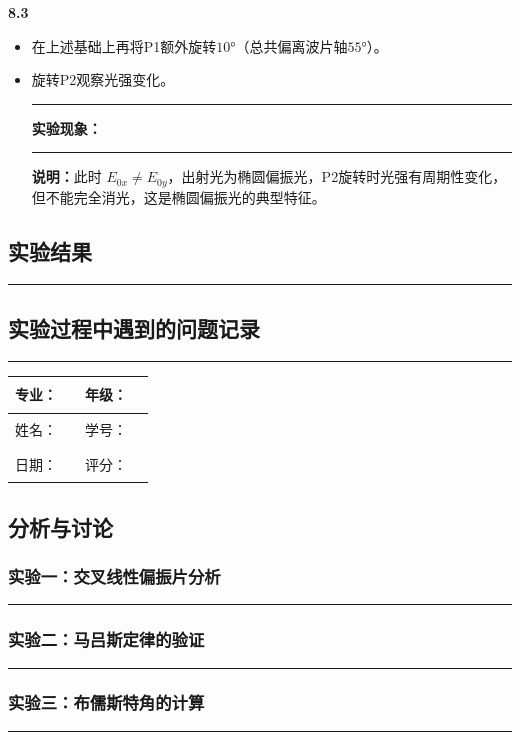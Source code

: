 \documentclass[dvipsnames, svgnames,a4paper,11pt]{article}
\newcommand{\recordblank}[1]{%
  \par\noindent\rule{0.95\linewidth}{0pt}\rule{0pt}{#1}\par}
\begin{document}
\textbf{8.3}
\begin{itemize}
    \item 在上述基础上再将P1额外旋转$10°$（总共偏离波片轴$55°$）。
    \item 旋转P2观察光强变化。
    \recordblank{6cm}
    \par\noindent\textbf{实验现象：}\par
\recordblank{4cm}
    
    \textbf{说明：}此时 $E_{0x} \neq E_{0y}$，出射光为椭圆偏振光，P2旋转时光强有周期性变化，但不能完全消光，这是椭圆偏振光的典型特征。
\end{itemize}

\subsection{实验结果}

\recordblank{5.5cm}
\subsection{实验过程中遇到的问题记录}
\recordblank{5cm}
\clearpage
\begin{table}
	\renewcommand\arraystretch{1.7}
	\begin{tabularx}{\textwidth}{|X|X|X|X|}
	\hline
	专业：& \rule{2.5cm}{0.4pt} & 年级：& \rule{2.5cm}{0.4pt}\\
	\hline
	姓名：& \rule{2.5cm}{0.4pt} & 学号：& \rule{3cm}{0.4pt}\\
	\hline
	日期：& \rule{3cm}{0.4pt} & 评分：& \rule{3cm}{0.4pt}\\
	\hline
	\end{tabularx}
\end{table}

\subsection{分析与讨论}
\subsubsection{实验一：交叉线性偏振片分析}
\recordblank{3.2cm}
\subsubsection{实验二：马吕斯定律的验证}
\recordblank{3.2cm}
\subsubsection{实验三：布儒斯特角的计算}
\recordblank{3.2cm}
\end{document}
